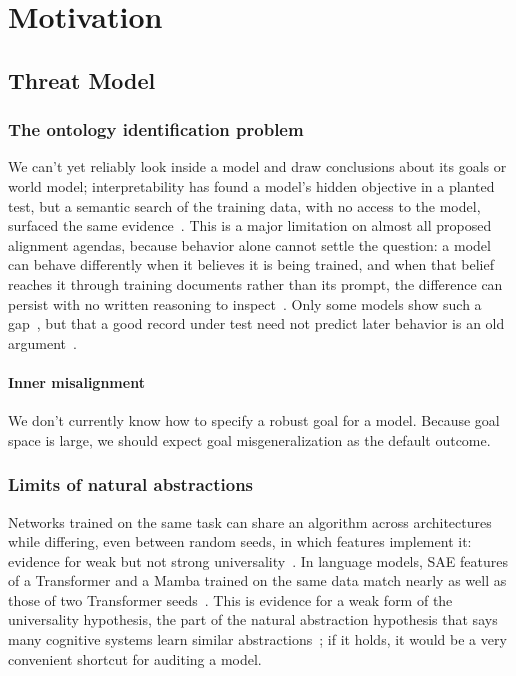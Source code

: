 \section{Motivation}

\subsection{Threat Model}

\subsubsection{The ontology identification problem}
We can't yet reliably look inside a model and draw conclusions about its
goals or world model; interpretability has found a model's hidden
objective in a planted test, but a semantic search of the training data,
with no access to the model, surfaced the same evidence~\cite{marks2025}.
This is a major limitation on almost all proposed alignment agendas,
because behavior alone cannot settle the question: a model can behave
differently when it believes it is being trained, and when that belief
reaches it through training documents rather than its prompt, the
difference can persist with no written reasoning to
inspect~\cite{greenblatt2024}. Only some models show such a
gap~\cite{sheshadri2025}, but that a good record under test need not
predict later behavior is an old argument~\cite[Ch.~8]{bostrom2014}.

\paragraph{Inner misalignment}
We don't currently know how to specify a robust goal for a model.
Because goal space is large, we should expect
goal misgeneralization as the default outcome.


\subsubsection{Limits of natural abstractions}
Networks trained on the same task can share an algorithm across
architectures while differing, even between random seeds, in which
features implement it: evidence for weak but not strong
universality~\cite{chughtai2023}. In language models, SAE features of a
Transformer and a Mamba trained on the same data match nearly as well as
those of two Transformer seeds~\cite{wang2024}.
This is evidence for a weak form of the universality hypothesis, the
part of the natural abstraction hypothesis that says many cognitive
systems learn similar abstractions~\cite{lang2023}; if it holds, it
would be a very convenient shortcut for auditing a model.

